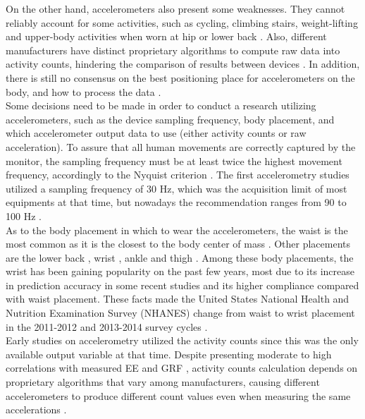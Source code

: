 \documentclass[11pt]{article}
\begin{document}
On the other hand, accelerometers also present some weaknesses. They cannot reliably account for some activities, such as cycling, climbing stairs, weight-lifting and upper-body activities when worn at hip or lower back \cite{Strath_2013}. Also, different manufacturers have distinct proprietary algorithms to compute raw data into activity counts, hindering the comparison of results between devices \cite{Plasqui_2013}. In addition, there is still no consensus on the best positioning place for accelerometers on the body, and how to process the data \cite{Troiano_2014}. \\

Some decisions need to be made in order to conduct a research utilizing accelerometers, such as the device sampling frequency, body placement, and which accelerometer output data to use (either activity counts or raw acceleration). To assure that all human movements are correctly captured by the monitor, the sampling frequency must be at least twice the highest movement frequency, accordingly to the Nyquist criterion \cite{Chen_2012}. The first accelerometry studies utilized a sampling frequency of 30 Hz, which was the acquisition limit of most equipments at that time, but nowadays the recommendation ranges from 90 to 100 Hz \cite{Migueles_2017}. \\

As to the body placement in which to wear the accelerometers, the waist is the most common as it is the closest to the body center of mass \cite{Chen_2005, Mendes_2018}. Other placements are the lower back \cite{Brandes_2012}, wrist \cite{Hildebrand_2017}, ankle \cite{Fortune_2014} and thigh \cite{Montoye_2016a}. Among these body placements, the wrist has been gaining popularity on the past few years, most due to its increase in prediction accuracy in some recent studies \cite{Phillips_2013, Hildebrand_2017} and its higher compliance compared with waist placement. These facts made the United States National Health and Nutrition Examination Survey (NHANES) change from waist to wrist placement in the 2011-2012 and 2013-2014 survey cycles \cite{Troiano_2014}. \\

Early studies on accelerometry utilized the activity counts since this was the only available output variable at that time. Despite presenting moderate to high correlations with measured EE \cite{Nichols_1999, Freedson_1998} and GRF \cite{Janz_2003}, activity counts calculation depends on proprietary algorithms that vary among manufacturers, causing different accelerometers to produce different count values even when measuring the same accelerations \cite{Chen_2012, Plasqui_2013}. \\
\end{document}
